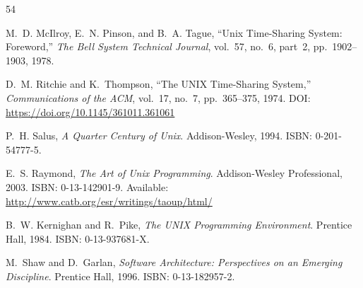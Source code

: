 \documentclass[acmlarge,nonacm,screen]{acmart}
\begin{document}
\begin{thebibliography}{54}



M.~D. McIlroy, E.~N. Pinson, and B.~A. Tague,
``Unix Time-Sharing System: Foreword,''
\textit{The Bell System Technical Journal}, vol.~57, no.~6, part~2, pp.~1902--1903, 1978.

D.~M. Ritchie and K.~Thompson,
``The UNIX Time-Sharing System,''
\textit{Communications of the ACM}, vol.~17, no.~7, pp.~365--375, 1974.
\newline DOI: \url{https://doi.org/10.1145/361011.361061}

P.~H. Salus,
\textit{A Quarter Century of Unix}.
Addison-Wesley, 1994. ISBN: 0-201-54777-5.

E.~S. Raymond,
\textit{The Art of Unix Programming}.
Addison-Wesley Professional, 2003. ISBN: 0-13-142901-9.
\newline Available: \url{http://www.catb.org/esr/writings/taoup/html/}

B.~W. Kernighan and R.~Pike,
\textit{The UNIX Programming Environment}.
Prentice Hall, 1984. ISBN: 0-13-937681-X.


M.~Shaw and D.~Garlan,
\textit{Software Architecture: Perspectives on an Emerging Discipline}.
Prentice Hall, 1996. ISBN: 0-13-182957-2.


\end{thebibliography}
\end{document}
